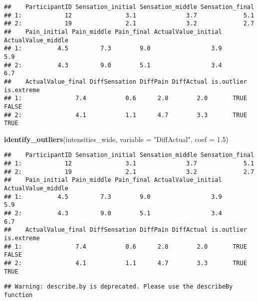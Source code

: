\documentclass[
]{article}
\newenvironment{Shaded}{\begin{snugshade}}{\end{snugshade}}
\newcommand{\DataTypeTok}[1]{\textcolor[rgb]{0.13,0.29,0.53}{#1}}
\newcommand{\FloatTok}[1]{\textcolor[rgb]{0.00,0.00,0.81}{#1}}
\newcommand{\KeywordTok}[1]{\textcolor[rgb]{0.13,0.29,0.53}{\textbf{#1}}}
\newcommand{\NormalTok}[1]{#1}
\newcommand{\OperatorTok}[1]{\textcolor[rgb]{0.81,0.36,0.00}{\textbf{#1}}}
\newcommand{\StringTok}[1]{\textcolor[rgb]{0.31,0.60,0.02}{#1}}
\begin{document}
\begin{verbatim}
##    ParticipantID Sensation_initial Sensation_middle Sensation_final
## 1:            12               3.1              3.7             5.1
## 2:            19               2.1              3.2             2.7
##    Pain_initial Pain_middle Pain_final ActualValue_initial ActualValue_middle
## 1:          4.5         7.3        9.0                 3.9                5.9
## 2:          4.3         9.0        5.1                 3.4                6.7
##    ActualValue_final DiffSensation DiffPain DiffActual is.outlier is.extreme
## 1:               7.4           0.6      2.8        2.0       TRUE      FALSE
## 2:               4.1           1.1      4.7        3.3       TRUE       TRUE
\end{verbatim}

\begin{Shaded}
\begin{Highlighting}[]
\KeywordTok{identify_outliers}\NormalTok{(intensities_wide, }\DataTypeTok{variable =} \StringTok{"DiffActual"}\NormalTok{, }\DataTypeTok{coef =} \FloatTok{1.5}\NormalTok{)}
\end{Highlighting}
\end{Shaded}

\begin{verbatim}
##    ParticipantID Sensation_initial Sensation_middle Sensation_final
## 1:            12               3.1              3.7             5.1
## 2:            19               2.1              3.2             2.7
##    Pain_initial Pain_middle Pain_final ActualValue_initial ActualValue_middle
## 1:          4.5         7.3        9.0                 3.9                5.9
## 2:          4.3         9.0        5.1                 3.4                6.7
##    ActualValue_final DiffSensation DiffPain DiffActual is.outlier is.extreme
## 1:               7.4           0.6      2.8        2.0       TRUE      FALSE
## 2:               4.1           1.1      4.7        3.3       TRUE       TRUE
\end{verbatim}

\begin{Shaded}
\end{Shaded}

\begin{verbatim}
## Warning: describe.by is deprecated. Please use the describeBy function
\end{verbatim}
\end{document}
